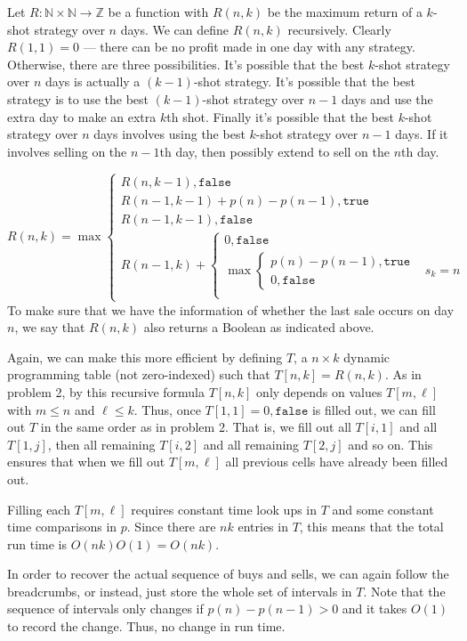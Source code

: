 \documentclass[12 pt, letterpaper]{hmcpset}
\begin{document}
\begin{solution}
	Let $R : \mathbb{N} \times \mathbb{N} \to \mathbb{Z}$ be a function with $R(n, k)$ be the maximum return of a $k$-shot strategy over $n$ days. We can define $R(n, k)$ recursively. Clearly $R(1, 1) = 0$ --- there can be no profit made in one day with any strategy. Otherwise, there are three possibilities. It's possible that the best $k$-shot strategy over $n$ days is actually a $(k - 1)$-shot strategy. It's possible that the best strategy is to use the best $(k - 1)$-shot strategy over $n - 1$ days and use the extra day to make an extra $k$th shot. Finally it's possible that the best $k$-shot strategy over $n$ days involves using the best $k$-shot strategy over $n - 1$ days. If it involves selling on the $n - 1$th day, then possibly extend to sell on the $n$th day.

	\[
		R(n, k) = \max \begin{cases}
			R(n, k - 1), \mathtt{false} \\
			R(n - 1, k - 1) + p(n) - p(n - 1), \mathtt{true} \\
			R(n - 1, k - 1), \mathtt{false} \\
			R(n - 1, k) + \begin{cases}
				0, \mathtt{false} \\
				\max \begin{cases}
					p(n) - p(n - 1), \mathtt{true} \\
					0, \mathtt{false}
				\end{cases} & s_{k} = n \\
			\end{cases}
		\end{cases}
	\]
	To make sure that we have the information of whether the last sale occurs on day $n$, we say that $R(n, k)$ also returns a Boolean as indicated above.


	Again, we can make this more efficient by defining $T$, a $n \times k$ dynamic programming table (not zero-indexed) such that $T[n, k] = R(n, k)$. As in problem 2, by this recursive formula $T[n, k]$ only depends on values $T[m, \ell]$ with $m \le n$ and $\ell \le k$. Thus, once $T[1, 1] = 0, \mathtt{false}$ is filled out, we can fill out $T$ in the same order as in problem 2. That is, we fill out all $T[i, 1]$ and all $T[1, j]$, then all remaining $T[i, 2]$ and all remaining $T[2, j]$ and so on. This ensures that when we fill out $T[m, \ell]$ all previous cells have already been filled out.

	Filling each  $T[m, \ell]$ requires constant time look ups in $T$ and some constant time comparisons in $p$. Since there are $n k$ entries in $T$, this means that the total run time is $O(n k) O(1) = O(n k)$.

	In order to recover the actual sequence of buys and sells, we can again follow the breadcrumbs, or instead, just store the whole set of intervals in $T$. Note that the sequence of intervals only changes if $p(n) - p(n - 1) > 0$ and it takes $O(1)$ to record the change. Thus, no change in run time.
\end{solution}
\end{document}
